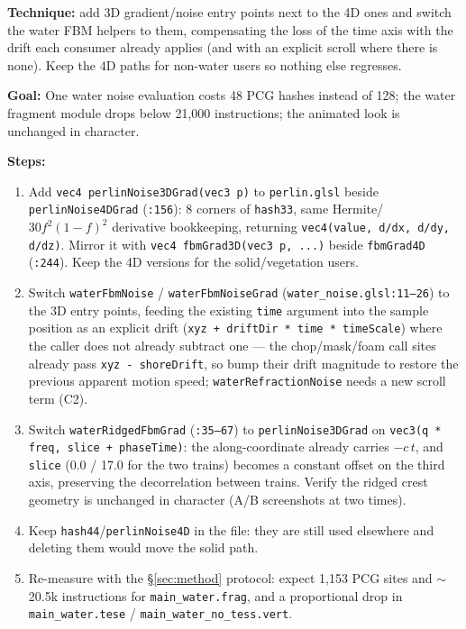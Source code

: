 \documentclass[11pt,a4paper]{article}
\begin{document}
\textbf{Technique:} add 3D gradient/noise entry points next to the 4D ones and switch the water FBM helpers to them,
compensating the loss of the time axis with the drift each consumer already applies (and with an explicit scroll where
there is none). Keep the 4D paths for non-water users so nothing else regresses.

\begin{tcolorbox}[promptbox={Prompt: Drop the Fourth Noise Axis from the Water Field}]
\textbf{Goal:} One water noise evaluation costs 48 PCG hashes instead of 128; the water fragment module drops below
21{,}000 instructions; the animated look is unchanged in character.

\textbf{Steps:}
\begin{enumerate}
    \item Add \texttt{vec4 perlinNoise3DGrad(vec3 p)} to \texttt{perlin.glsl} beside \texttt{perlinNoise4DGrad}
    (\texttt{:156}): 8 corners of \texttt{hash33}, same Hermite/$30f^2(1-f)^2$ derivative bookkeeping, returning
    \texttt{vec4(value, d/dx, d/dy, d/dz)}. Mirror it with \texttt{vec4 fbmGrad3D(vec3 p, ...)} beside
    \texttt{fbmGrad4D} (\texttt{:244}). Keep the 4D versions for the solid/vegetation users.
    \item Switch \texttt{waterFbmNoise} / \texttt{waterFbmNoiseGrad} (\texttt{water\_noise.glsl:11--26}) to the 3D
    entry points, feeding the existing \texttt{time} argument into the sample position as an explicit drift
    (\texttt{xyz + driftDir * time * timeScale}) where the caller does not already subtract one --- the chop/mask/foam
    call sites already pass \texttt{xyz - shoreDrift}, so bump their drift magnitude to restore the previous apparent
    motion speed; \texttt{waterRefractionNoise} needs a new scroll term (C2).
    \item Switch \texttt{waterRidgedFbmGrad} (\texttt{:35--67}) to \texttt{perlinNoise3DGrad} on
    \texttt{vec3(q * freq, slice + phaseTime)}: the along-coordinate already carries $-c\,t$, and \texttt{slice}
    (0.0 / 17.0 for the two trains) becomes a constant offset on the third axis, preserving the decorrelation between
    trains. Verify the ridged crest geometry is unchanged in character (A/B screenshots at two times).
    \item Keep \texttt{hash44}/\texttt{perlinNoise4D} in the file: they are still used elsewhere and deleting them
    would move the solid path.
    \item Re-measure with the \S\ref{sec:method} protocol: expect 1,153 PCG sites and $\sim$20.5k instructions for
    \texttt{main\_water.frag}, and a proportional drop in \texttt{main\_water.tese} /
    \texttt{main\_water\_no\_tess.vert}.
\end{enumerate}


\end{tcolorbox}
\end{document}

